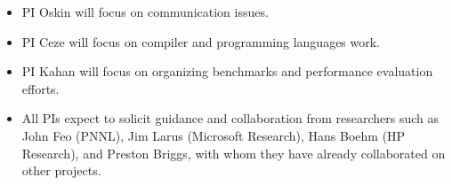 \begin{itemize}
\item PI Oskin will focus on communication issues. 
\item PI Ceze will focus on compiler and programming languages work.
\item PI Kahan will focus on organizing benchmarks and performance evaluation efforts.
\item All PIs expect to solicit guidance and collaboration from
  researchers such as John Feo (PNNL), Jim Larus (Microsoft Research), Hans
  Boehm (HP Research), and Preston Briggs,  with whom
  they have already collaborated on other projects.
\end{itemize}




